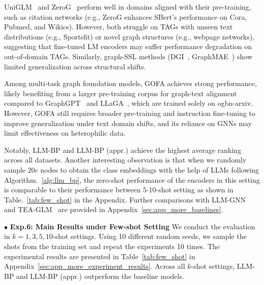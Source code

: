 UniGLM~\cite{fang2024uniglm} and ZeroG~\cite{li2024zerog} perform well in domains aligned with their pre-training, such as citation networks (e.g., ZeroG enhances SBert's performance on Cora, Pubmed, and Wikics). However, both struggle on TAGs with unseen text distributions (e.g., Sportsfit) or novel graph structures (e.g., webpage networks), suggesting that fine-tuned LM encoders may suffer performance degradation on out-of-domain TAGs.
Similarly, graph-SSL methods (DGI~\cite{velivckovic2018deep}, GraphMAE~\cite{hou2022graphmae}) show limited generalization across structural shifts. 

Among multi-task graph foundation models, GOFA achieves strong performance, likely benefiting from a larger pre-training corpus for graph-text alignment~\cite{hu2021ogb, ding2023enhancing} compared to GraphGPT~\cite{tang2024graphgpt} and LLaGA~\cite{chen2024llaga}, which are trained solely on ogbn-arxiv. However, GOFA still requires broader pre-training and instruction fine-tuning to improve generalization under text domain shifts, and its reliance on GNNs may limit effectiveness on heterophilic data.

Notably, LLM-BP and LLM-BP (appr.) achieve the highest average ranking across all datasets. Another interesting observation is that when we randomly sample $20c$ nodes to obtain the class embeddings with the help of LLMs following Algorithm.~\ref{alg:llm_bp}, the zero-shot performance of the encoders in this setting is comparable to their performance between $5$-$10$-shot setting as shown in Table.~\ref{tab:few_shot} in the Appendix.
Further comparisons with LLM-GNN~\cite{chen2023label} and TEA-GLM~\cite{wang2024llms} are provided in Appendix~\ref{sec:app_more_baselines}.


$\bullet$ \textbf{Exp.6: Main Results under Few-shot Setting} We conduct the evaluation in $k=1,3,5,10$-shot settings. %
Using 10 different random seeds, we sample the shots from the training set and repeat the experiments 10 times. The experimental results are presented in Table~\ref{tab:few_shot} in Appendix~\ref{sec:app_more_experiment_results}. Across all 
$k$-shot settings, LLM-BP and LLM-BP (appr.) outperform the baseline models. %







